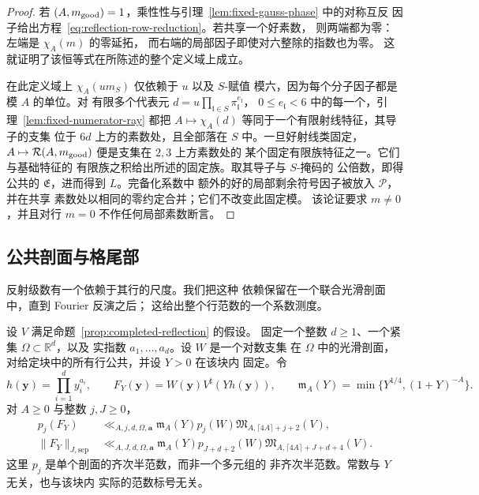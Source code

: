 \begin{proof}
若 $(A,m_{\rm good})=1$，乘性性与引理~\ref{lem:fixed-gauss-phase} 中的对称互反
因子给出方程~\eqref{eq:reflection-row-reduction}。若共享一个好素数，
则两端都为零：左端是 $\chi_A(m)$ 的零延拓，
而右端的局部因子即使对六整除的指数也为零。
这就证明了该恒等式在所陈述的整个定义域上成立。

在此定义域上 $\chi_A(u m_S)$ 仅依赖于 $u$ 以及 $S$-赋值
模六，因为每个分子因子都是模 $A$ 的单位。对
有限多个代表元
$d=u\prod_{\mathfrak l\in S}\pi_{\mathfrak l}^{e_{\mathfrak l}}$，
$0\le e_{\mathfrak l}<6$ 中的每一个，引理~\ref{lem:fixed-numerator-ray} 都把
$A\mapsto\chi_A(d)$ 等同于一个有限射线特征，其导子的支集
位于 $6d$ 上方的素数处，且全部落在 $S$ 中。一旦好射线类固定，
$A\mapsto\mathcal R(A,m_{\rm good})$ 便是支集在 $2,3$ 上方素数处的
某个固定有限族特征之一。它们与基础特征的
有限族之积给出所述的固定族。取其导子与 $S$-掩码的
公倍数，即得公共的 $\mathfrak E$，进而得到 $L$。完备化系数中
额外的好的局部剩余符号因子被放入 $\mathcal P$，并在共享
素数处以相同的零约定合并；它们不改变此固定模。
该论证要求 $m\ne0$，并且对行
$m=0$ 不作任何局部素数断言。
\end{proof}

\subsection{公共剖面与格尾部}

反射级数有一个依赖于其行的尺度。我们把这种
依赖保留在一个联合光滑剖面中，直到 Fourier 反演之后；
这给出整个行范数的一个系数测度。

\begin{lemma}[公共环形核剖面]
\label{lem:reflection-common-profile}
设 $V$ 满足命题~\ref{prop:completed-reflection} 的假设。
固定一个整数 $d\ge1$、一个紧集 $\Omega\subset\mathbb R^d$，以及
实指数 $a_1,\ldots,a_d$。设 $W$ 是一个对数支集
在 $\Omega$ 中的光滑剖面，对给定块中的所有行公共，并设 $Y>0$ 在该块内
固定。令
\[
 h(\boldsymbol y)=\prod_{i=1}^d y_i^{a_i},\qquad
 F_Y(\boldsymbol y)=W(\boldsymbol y)V^\sharp(Yh(\boldsymbol y)),\qquad
 \mathfrak m_A(Y)=\min\{Y^{1/4},(1+Y)^{-A}\}.
\]
对 $A\ge0$ 与整数 $j,J\ge0$，
\begin{align}
 p_j(F_Y)&\ll_{A,j,d,\Omega,\boldsymbol a}
 \mathfrak m_A(Y)p_j(W)
 \mathfrak M_{A,\lceil4A\rceil+j+2}(V),
 \label{eq:reflection-common-profile}\\
 \|F_Y\|_{J,\mathrm{sep}}&\ll_{A,J,d,\Omega,\boldsymbol a}
 \mathfrak m_A(Y)p_{J+d+2}(W)
 \mathfrak M_{A,\lceil4A\rceil+J+d+4}(V).
 \label{eq:reflection-common-measure}
\end{align}
这里 $p_j$ 是单个剖面的齐次半范数，而非一个多元组的
非齐次半范数。常数与 $Y$ 无关，也与该块内
实际的范数标号无关。
\end{lemma}


